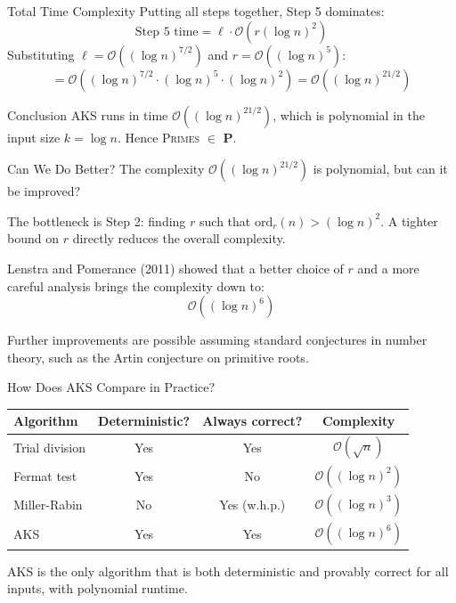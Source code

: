 \documentclass{beamer}
\begin{document}

\begin{frame}{Total Time Complexity}
Putting all steps together, Step 5 dominates:
\[
    \text{Step 5 time} = \ell \cdot \mathcal{O}(r(\log n)^2)
\]
\vspace{0.5em}
Substituting $\ell = \mathcal{O}((\log n)^{7/2})$ and $r = \mathcal{O}((\log n)^5)$:
\[
    = \mathcal{O}\!\left((\log n)^{7/2} \cdot (\log n)^5 \cdot (\log n)^2\right)
    = \mathcal{O}\!\left((\log n)^{21/2}\right)
\]
\vspace{0.5em}

\begin{block}{Conclusion}
AKS runs in time $\mathcal{O}((\log n)^{21/2})$, which is polynomial in
the input size $k = \log n$. Hence \textsc{Primes} $\in$ \textbf{P}.
\end{block}
\end{frame}
\begin{frame}{Can We Do Better?}
The complexity $\mathcal{O}((\log n)^{21/2})$ is polynomial, but can it be improved?

The bottleneck is Step 2: finding $r$ such that $\mathrm{ord}_r(n) > (\log n)^2$.
A tighter bound on $r$ directly reduces the overall complexity.

Lenstra and Pomerance (2011) showed that a better choice of $r$
and a more careful analysis brings the complexity down to:
\[
    \mathcal{O}((\log n)^6)
\]

Further improvements are possible assuming standard conjectures
in number theory, such as the Artin conjecture on primitive roots.
\end{frame}


\begin{frame}{How Does AKS Compare in Practice?}
\begin{center}
\renewcommand{\arraystretch}{1.6}
\begin{tabular}{lccc}
\hline
\textbf{Algorithm} & \textbf{Deterministic?} & \textbf{Always correct?} & \textbf{Complexity} \\
\hline
Trial division     & Yes & Yes & $\mathcal{O}(\sqrt{n})$ \\
Fermat test        & Yes & No  & $\mathcal{O}((\log n)^2)$ \\
Miller-Rabin      & No  & Yes (w.h.p.) & $\mathcal{O}((\log n)^3)$ \\
AKS                & Yes & Yes & $\mathcal{O}((\log n)^6)$ \\
\hline
\end{tabular}
\end{center}

AKS is the only algorithm that is both deterministic and
provably correct for all inputs, with polynomial runtime.
\end{frame}
\end{document}
